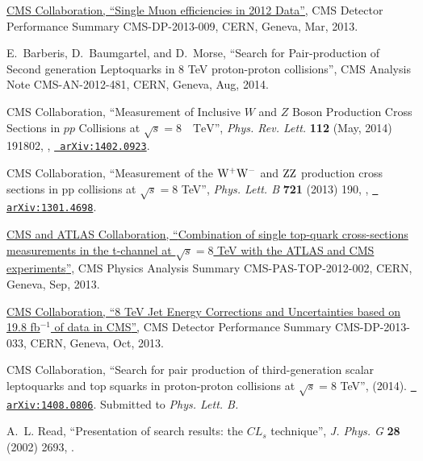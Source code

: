 \documentclass[12pt]{thesis}  %
\begin{document}
\begin{thebibliography}{100}
\href {https://cds.cern.ch/record/1536406} {{ CMS} Collaboration, ``{Single
  Muon efficiencies in 2012 Data}'',} CMS Detector Performance Summary
  CMS-DP-2013-009, CERN, Geneva, Mar, 2013.

\hrefCMSnoop {} {E.~Barberis, D.~Baumgartel, and D.~Morse, ``Search for
  Pair-production of Second generation Leptoquarks in 8 TeV proton-proton
  collisions'',} CMS Analysis Note CMS-AN-2012-481, CERN, Geneva, Aug, 2014.

\hrefCMSnoop {} {{ CMS} Collaboration, ``Measurement of Inclusive $W$ and $Z$
  Boson Production Cross Sections in $pp$ Collisions at $\sqrt{s}=8\text{
  }\text{ }\mathrm{TeV}$'',} \textit{ Phys. Rev. Lett.} \textbf{ 112} (May,
  2014) 191802,
  \href{http://dx.doi.org/10.1103/PhysRevLett.112.191802}{},
  \href{http://www.arXiv.org/abs/1402.0923}{\texttt{ arXiv:1402.0923}}.

\hrefCMSnoop {} {{ CMS} Collaboration, ``Measurement of the $\mathrm{W}^{+}\mathrm{W}^{-}$ and
  $\mathrm{Z}\mathrm{Z}$ production cross sections in pp collisions at $\sqrt{s} = 8$ TeV'',}
  \textit{ Phys. Lett. B} \textbf{ 721} (2013) 190,
  \href{http://dx.doi.org/10.1016/j.physletb.2013.03.027}{},
  \href{http://www.arXiv.org/abs/1301.4698}{\texttt{ arXiv:1301.4698}}.

\href {https://cds.cern.ch/record/1601029} {{ CMS and ATLAS} Collaboration,
  ``{Combination of single top-quark cross-sections measurements in the
  t-channel at $\sqrt{s} = 8$ TeV with the ATLAS and CMS experiments}'',} CMS
  Physics Analysis Summary CMS-PAS-TOP-2012-002, CERN, Geneva, Sep, 2013.

\href {https://cds.cern.ch/record/1627305} {{ CMS} Collaboration, ``{8 TeV Jet
  Energy Corrections and Uncertainties based on 19.8 fb$^{-1}$ of data in
  CMS}'',} CMS Detector Performance Summary CMS-DP-2013-033, CERN, Geneva, Oct,
  2013.

\hrefCMSnoop {} {{ CMS} Collaboration, ``Search for pair production of
  third-generation scalar leptoquarks and top squarks in proton-proton
  collisions at $\sqrt{s} = 8$ TeV'',} (2014).
  \href{http://www.arXiv.org/abs/1408.0806}{\texttt{ arXiv:1408.0806}}.
  Submitted to \emph{Phys. Lett. B.}

\hrefCMSnoop {} {A.~L. Read, ``{Presentation of search results: the $CL_{s}$
  technique}'',} \textit{ J. Phys. G} \textbf{ 28} (2002) 2693,
  \href{http://dx.doi.org/10.1088/0954-3899/28/10/313}{}.


\end{thebibliography}
\end{document}
